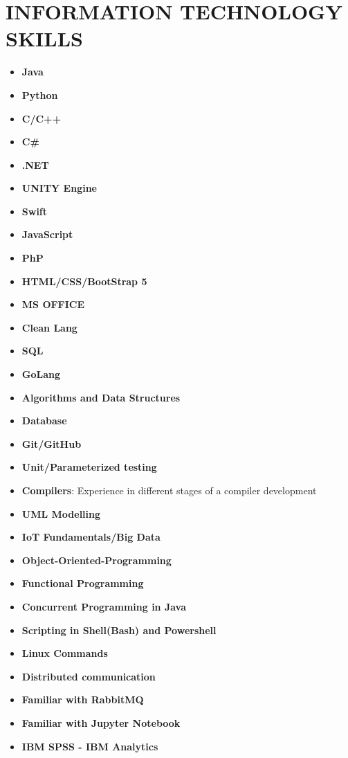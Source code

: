 \documentclass[11 pt,oneside,a4paper,titlepage]{article}
\begin{document}
{\begin{minipage}{11.3cm}
        \section*{{\faCode} INFORMATION TECHNOLOGY SKILLS}
        \vspace*{-0.5cm}
        \hfill \break
        \begin{multicols}{2}    
        \begin{itemize}
        \footnotesize
            \item \textbf{Java}
            \item \textbf{Python}
            \item \textbf{C/C++}
            \item \textbf{C\#}
            \item \textbf{.NET}
            \item \textbf{UNITY Engine}
            \item \textbf{Swift}
            \item \textbf{JavaScript}
            \item \textbf{PhP}
            \item \textbf{HTML/CSS/BootStrap 5}
            \item \textbf{MS OFFICE}
            \item \textbf{Clean Lang}
            \item \textbf{SQL}
            \item \textbf{GoLang}
            \item \textbf{Algorithms and Data Structures}
            \item \textbf{Database}
            \item \textbf{Git/GitHub}
            \item \textbf{Unit/Parameterized testing}
            \item \textbf{Compilers}: Experience in different stages of a compiler development
            \item \textbf{UML Modelling}
            \item \textbf{IoT Fundamentals/Big Data}
            \item \textbf{Object-Oriented-Programming}
            \item \textbf{Functional Programming}
            \item \textbf{Concurrent Programming in Java}
            \item \textbf{Scripting in Shell(Bash) and Powershell}
            \item \textbf{Linux Commands}
            \item \textbf{Distributed communication}
            \item \textbf{Familiar with RabbitMQ}
            \item \textbf{Familiar with Jupyter Notebook}
            \item \textbf{IBM SPSS - IBM Analytics}
            

\end{itemize}
\end{multicols}
\end{minipage}}
\end{document}
